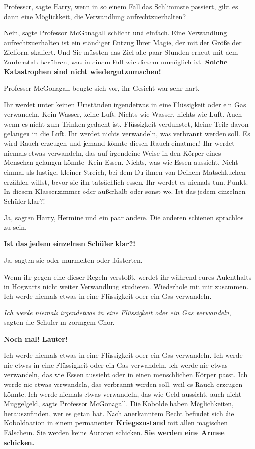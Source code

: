 \glqq{}Professor\grqq{}, sagte Harry, \glqq{}wenn in so einem Fall das Schlimmste
passiert, gibt es dann eine Möglichkeit, die Verwandlung
aufrechtzuerhalten?\grqq{}

\glqq{}Nein\grqq{}, sagte Professor McGonagall schlicht und einfach. \glqq{}Eine
Verwandlung aufrechtzuerhalten ist ein ständiger Entzug Ihrer Magie, der mit der
Größe der Zielform skaliert. Und Sie müssten das Ziel alle paar Stunden erneut
mit dem Zauberstab berühren, was in einem Fall wie diesem unmöglich ist.
\textbf{Solche Katastrophen sind nicht wiedergutzumachen!}\grqq{}

Professor McGonagall beugte sich vor, ihr Gesicht war sehr hart.

\glqq{}Ihr werdet unter keinen Umständen irgendetwas in eine Flüssigkeit oder ein
Gas verwandeln. Kein Wasser, keine Luft. Nichts wie Wasser, nichts wie Luft.
Auch wenn es nicht zum Trinken gedacht ist. Flüssigkeit verdunstet, kleine Teile
davon gelangen in die Luft. Ihr werdet nichts verwandeln, was verbrannt werden
soll. Es wird Rauch erzeugen und jemand könnte diesen Rauch einatmen! Ihr werdet
niemals etwas verwandeln, das auf irgendeine Weise in den Körper eines Menschen
gelangen könnte. Kein Essen. Nichts, was wie Essen aussieht. Nicht einmal als
lustiger kleiner Streich, bei dem Du ihnen von Deinem Matschkuchen erzählen
willst, bevor sie ihn tatsächlich essen. Ihr werdet es niemals tun. Punkt. In
diesem Klassenzimmer oder außerhalb oder sonst wo. Ist das jedem einzelnen
Schüler klar?!\grqq{}

\glqq{}Ja\grqq{}, sagten Harry, Hermine und ein paar andere. Die anderen
schienen sprachlos zu sein.

\textbf{\glqq{}Ist das jedem einzelnen Schüler klar?!\grqq{}}

\glqq{}Ja\grqq{}, sagten sie oder murmelten oder flüsterten.

\glqq{}Wenn ihr gegen eine dieser Regeln verstoßt, werdet ihr während eures
Aufenthalts in Hogwarts nicht weiter Verwandlung studieren. Wiederhole mit mir
zusammen. Ich werde niemals etwas in eine Flüssigkeit oder ein Gas
verwandeln.\grqq{}

\glqq{}\emph{Ich werde niemals irgendetwas in eine Flüssigkeit oder ein Gas
verwandeln}\grqq{}, sagten die Schüler in zornigem Chor.

\glqq{}\textbf{Noch mal! Lauter!}\grqq{}

\glqq{}Ich werde niemals etwas in eine Flüssigkeit oder ein Gas
verwandeln.\grqq{} \glqq{}Ich werde nie etwas in eine Flüssigkeit oder ein Gas
verwandeln.\grqq{} \glqq{} Ich werde nie etwas verwandeln, das wie Essen
aussieht oder in einen menschlichen Körper passt.\grqq{} \glqq{}Ich werde nie
etwas verwandeln, das verbrannt werden soll, weil es Rauch erzeugen
könnte.\grqq{} \glqq{}Ich werde niemals etwas verwandeln, das wie Geld aussieht,
auch nicht Muggelgeld\grqq{}, sagte Professor McGonagall. \glqq{}Die Kobolde
haben Möglichkeiten, herauszufinden, wer es getan hat. Nach anerkanntem Recht
befindet sich die Koboldnation in einem permanenten \textbf{Kriegszustand} mit
allen magischen Fälschern. Sie werden keine Auroren schicken. \textbf{Sie werden
eine Armee schicken.}\grqq{}

